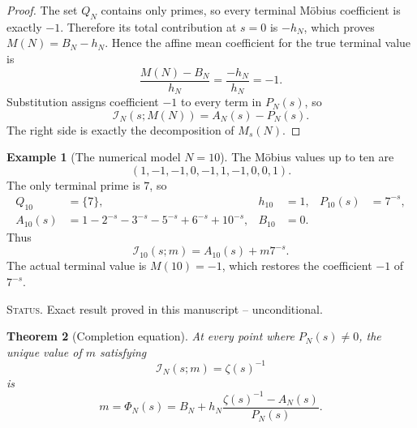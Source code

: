 \documentclass[11pt]{amsart}
\numberwithin{equation}{section}
\theoremstyle{plain}
\newtheorem{theorem}{Theorem}[section]
\theoremstyle{definition}
\newtheorem{example}[theorem]{Example}
\theoremstyle{remark}
\newcommand{\1}{\mathbf{1}}
\newcommand{\statusnote}[1]{%
  \par\smallskip\noindent
  \begingroup\footnotesize\textsc{Status.} #1\endgroup
  \par\smallskip}
\begin{document}
\begin{proof}
The set \(Q_N\) contains only primes, so every terminal Möbius coefficient
is exactly \(-1\).  Therefore its total contribution at \(s=0\) is
\(-h_N\), which proves \(M(N)=B_N-h_N\).  Hence the affine mean coefficient
for the true terminal value is
\begin{equation}
\frac{M(N)-B_N}{h_N}
=
\frac{-h_N}{h_N}
=-1.
\label{eq:true_terminal_mean_proof_detailed}
\end{equation}
Substitution assigns coefficient \(-1\) to every term in \(P_N(s)\), so
\begin{equation}
\mathcal I_N(s;M(N))
=
A_N(s)-P_N(s).
\label{eq:true_terminal_interpolation_proof_detailed}
\end{equation}
The right side is exactly the decomposition of \(M_s(N)\).
\end{proof}

\begin{example}[The numerical model \(N=10\)]
\label{ex:N10_affine_interpolation}
The Möbius values up to ten are
\begin{equation}
(1,-1,-1,0,-1,1,-1,0,0,1).
\label{eq:N10_mobius_vector}
\end{equation}
The only terminal prime is \(7\), so
\begin{align}
Q_{10}&=\{7\},
&h_{10}&=1,
&P_{10}(s)&=7^{-s},
\label{eq:N10_terminal_data_detailed}
\\
A_{10}(s)
&=
1-2^{-s}-3^{-s}-5^{-s}+6^{-s}+10^{-s},
&B_{10}&=0.
\label{eq:N10_A_B_detailed}
\end{align}
Thus
\begin{equation}
\mathcal I_{10}(s;m)
=
A_{10}(s)+m7^{-s}.
\label{eq:N10_interpolation_detailed}
\end{equation}
The actual terminal value is \(M(10)=-1\), which restores the coefficient
\(-1\) of \(7^{-s}\).
\end{example}

\statusnote{Exact result proved in this manuscript -- unconditional.}
\begin{theorem}[Completion equation]
\label{thm:completion_equation}
At every point where \(P_N(s)\neq0\), the unique value of \(m\) satisfying
\begin{equation}
\mathcal I_N(s;m)=\zeta(s)^{-1}
\label{eq:completion_equation}
\end{equation}
is
\begin{equation}
\boxed{
 m=\Phi_N(s)
 =
 B_N+h_N\frac{\zeta(s)^{-1}-A_N(s)}{P_N(s)}.
}
\label{eq:completion_solution}
\end{equation}
\end{theorem}
\end{document}
